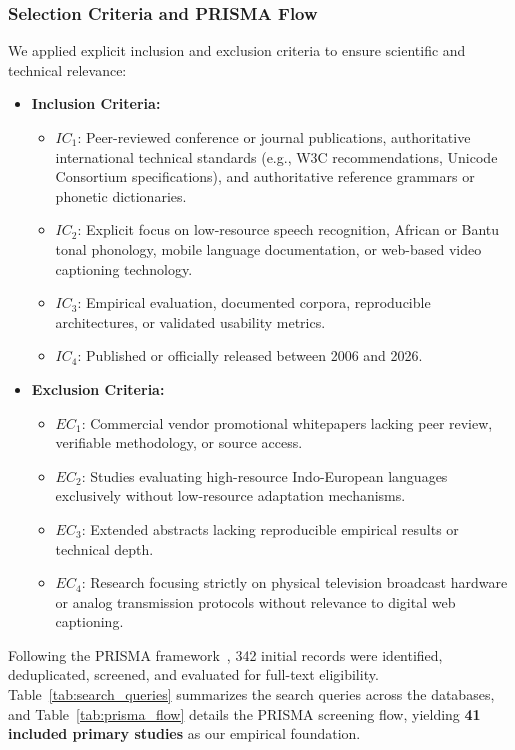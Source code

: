 \documentclass[a4paper,11pt]{article}
\begin{document}
\subsubsection{Selection Criteria and PRISMA Flow}
\label{sec:chap2_select_papers}
We applied explicit inclusion and exclusion criteria to ensure scientific and technical relevance:
\begin{itemize}
    \item \textbf{Inclusion Criteria:} 
    \begin{itemize}
        \item $IC_1$: Peer-reviewed conference or journal publications, authoritative international technical standards (e.g., W3C recommendations, Unicode Consortium specifications), and authoritative reference grammars or phonetic dictionaries.
        \item $IC_2$: Explicit focus on low-resource speech recognition, African or Bantu tonal phonology, mobile language documentation, or web-based video captioning technology.
        \item $IC_3$: Empirical evaluation, documented corpora, reproducible architectures, or validated usability metrics.
        \item $IC_4$: Published or officially released between 2006 and 2026.
    \end{itemize}
    \item \textbf{Exclusion Criteria:} 
    \begin{itemize}
        \item $EC_1$: Commercial vendor promotional whitepapers lacking peer review, verifiable methodology, or source access.
        \item $EC_2$: Studies evaluating high-resource Indo-European languages exclusively without low-resource adaptation mechanisms.
        \item $EC_3$: Extended abstracts lacking reproducible empirical results or technical depth.
        \item $EC_4$: Research focusing strictly on physical television broadcast hardware or analog transmission protocols without relevance to digital web captioning.
    \end{itemize}
\end{itemize}

Following the PRISMA framework~\cite{page2021prisma}, 342 initial records were identified, deduplicated, screened, and evaluated for full-text eligibility. Table~\ref{tab:search_queries} summarizes the search queries across the databases, and Table~\ref{tab:prisma_flow} details the PRISMA screening flow, yielding \textbf{41 included primary studies} as our empirical foundation.
\end{document}

